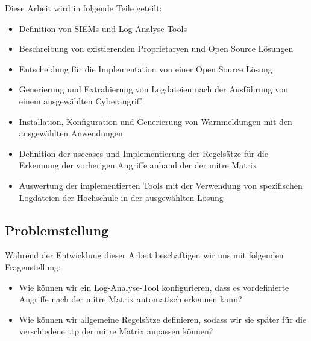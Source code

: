 Diese Arbeit wird in folgende Teile geteilt: 





{
\begin{itemize}[noitemsep]
   \item	Definition von SIEMs und Log-Analyse-Tools 
   \item	Beschreibung von existierenden \gls{Proprietary}en und Open Source Lösungen
   \item	Entscheidung für die Implementation von einer Open Source Lösung
   \item Generierung und Extrahierung von Logdateien nach der Ausführung von einem ausgewählten \gls{Cyberangriff} 
   \item	Installation, Konfiguration und Generierung von Warnmeldungen mit den ausgewählten Anwendungen 
   \item	Definition der \gls{usecases} und Implementierung der Regelsätze für die Erkennung der vorherigen Angriffe anhand der  der \gls{mitre} Matrix 
   \item	Auswertung der implementierten Tools mit der Verwendung von  spezifischen Logdateien der Hochschule in der ausgewählten Lösung
\end{itemize}
}

\subsection{Problemstellung}
Während der Entwicklung dieser Arbeit beschäftigen wir uns mit folgenden Fragenstellung: 

{
\begin{itemize}[noitemsep]
   \item Wie können wir ein Log-Analyse-Tool konfigurieren, dass es vordefinierte Angriffe nach der \gls{mitre} Matrix automatisch erkennen kann? 
   \item Wie können wir allgemeine Regelsätze definieren, sodass wir sie später für die verschiedene \gls{ttp} der \gls{mitre} Matrix anpassen können?
\end{itemize}
}

